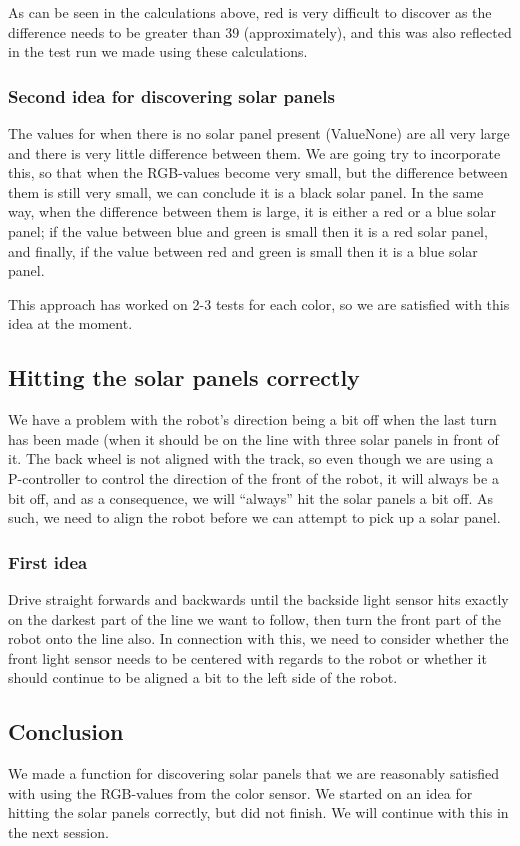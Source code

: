 As can be seen in the calculations above, red is very difficult to
discover as the difference needs to be greater than 39 (approximately),
and this was also reflected in the test run we made using these
calculations.

\subsubsection{Second idea for discovering solar panels}

The values for when there is no solar panel present (ValueNone) are all
very large and there is very little difference between them. We are
going try to incorporate this, so that when the RGB-values become very
small, but the difference between them is still very small, we can
conclude it is a black solar panel. In the same way, when the difference
between them is large, it is either a red or a blue solar panel; if the value between blue and green is small then it is a red solar panel, and finally, if the value between red and green is small then it is a blue solar panel.

This approach has worked on 2-3 tests for each color, so we are
satisfied with this idea at the moment.

\subsection{Hitting the solar panels correctly}

We have a problem with the robot's direction being a bit off when the
last turn has been made (when it should be on the line with three solar
panels in front of it. The back wheel is not aligned with the track, so
even though we are using a P-controller to control the direction of the
front of the robot, it will always be a bit off, and as a consequence,
we will ``always'' hit the solar panels a bit off. As such, we need to
align the robot before we can attempt to pick up a solar panel.

\subsubsection{First idea}

Drive straight forwards and backwards until the backside light sensor
hits exactly on the darkest part of the line we want to follow, then
turn the front part of the robot onto the line also. In connection with
this, we need to consider whether the front light sensor needs to be
centered with regards to the robot or whether it should continue to be
aligned a bit to the left side of the robot.

\subsection{Conclusion}

We made a function for discovering solar panels that we are reasonably
satisfied with using the RGB-values from the color sensor. We started on
an idea for hitting the solar panels correctly, but did not finish. We
will continue with this in the next session.
